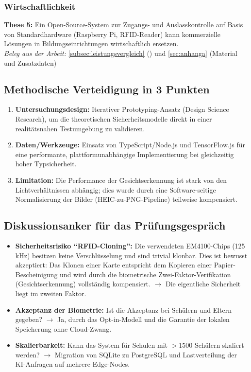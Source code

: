 \subsubsection*{Wirtschaftlichkeit}

\textbf{These 5:} Ein Open-Source-System zur Zugangs- und Auslasskontrolle auf Basis von Standardhardware (Raspberry Pi, RFID-Reader) kann kommerzielle Lösungen in Bildungseinrichtungen wirtschaftlich ersetzen.\\
\textit{Beleg aus der Arbeit:} \autoref{subsec:leistungsvergleich} () und \autoref{sec:anhanga} (Material und Zusatzdaten)

\vspace{1em}
\subsection*{Methodische Verteidigung in 3 Punkten}
\begin{enumerate}[leftmargin=*]
\item \textbf{Untersuchungsdesign:} Iterativer Prototyping-Ansatz (Design Science Research), um die theoretischen Sicherheitsmodelle direkt in einer realitätsnahen Testumgebung zu validieren.
\item \textbf{Daten/Werkzeuge:} Einsatz von TypeScript/Node.js und TensorFlow.js für eine performante, plattformunabhängige Implementierung bei gleichzeitig hoher Typsicherheit.
\item \textbf{Limitation:} Die Performance der Gesichtserkennung ist stark von den Lichtverhältnissen abhängig; dies wurde durch eine Software-seitige Normalisierung der Bilder (HEIC-zu-PNG-Pipeline) teilweise kompensiert.
\end{enumerate}

\subsection*{Diskussionsanker für das Prüfungsgespräch}
\begin{itemize}[leftmargin=*]
\item \textbf{Sicherheitsrisiko \enquote{RFID-Cloning}:} Die verwendeten EM4100-Chips (125\,kHz) besitzen keine Verschlüsselung und sind trivial klonbar. Dies ist bewusst akzeptiert: Das Klonen einer Karte entspricht dem Kopieren einer Papier-Bescheinigung und wird durch die biometrische Zwei-Faktor-Verifikation (Gesichtserkennung) vollständig kompensiert. $\rightarrow$ Die eigentliche Sicherheit liegt im zweiten Faktor.
\item \textbf{Akzeptanz der Biometrie:} Ist die Akzeptanz bei Schülern und Eltern gegeben? $\rightarrow$ Ja, durch das Opt-in-Modell und die Garantie der lokalen Speicherung ohne Cloud-Zwang.
\item \textbf{Skalierbarkeit:} Kann das System für Schulen mit $>1500$ Schülern skaliert werden? $\rightarrow$ Migration von SQLite zu PostgreSQL und Lastverteilung der KI-Anfragen auf mehrere Edge-Nodes.
\end{itemize}

